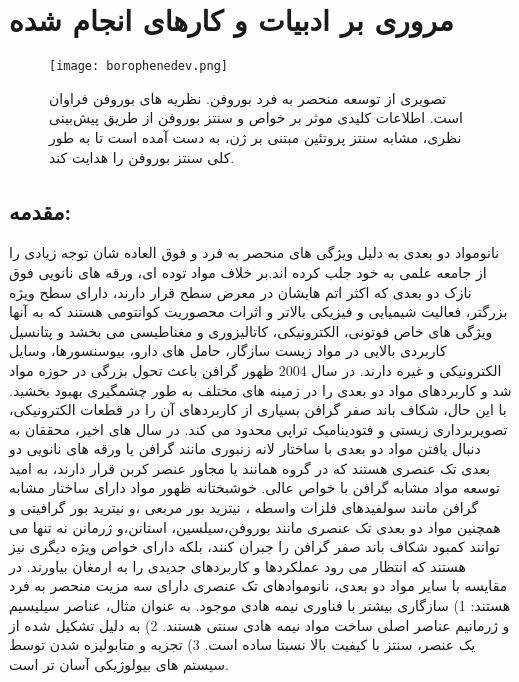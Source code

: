 \chapter{مروری بر ادبیات و کار‌های انجام شده}
\clearpage
\begin{figure*}[!ht]
    \centering
    \texttt{[image: borophenedev.png]}
    \caption{تصویری از توسعه منحصر به فرد بوروفن. نظریه های بوروفن فراوان است. اطلاعات کلیدی موثر بر خواص و سنتز بوروفن از طریق پیش‌بینی نظری، مشابه سنتز پروتئین مبتنی بر ژن، به دست آمده است تا به طور کلی سنتز بوروفن را هدایت کند.}
    \label{fig:borophenedev}
\end{figure*}
\section{مقدمه:}
نانومواد دو بعدی به دلیل ویژگی های منحصر به فرد و فوق العاده شان توجه زیادی را از جامعه علمی به خود جلب کرده اند.\cite{huangGraphenebasedComposites2012, huangGrapheneBasedMaterialsSynthesis2011}بر خلاف مواد توده ای، ورقه های نانویی فوق نازک دو بعدی که اکثر اتم هایشان در معرض سطح قرار دارند، دارای سطح ویژه بزرگتر، فعالیت شیمیایی و فیزیکی بالاتر و اثرات محصوریت کوانتومی هستند که به آنها ویژگی های خاص فوتونی، الکترونیکی، کاتالیزوری و مغناطیسی می بخشد و پتانسیل کاربردی بالایی در مواد زیست سازگار، حامل های دارو، بیوسنسورها، وسایل الکترونیکی و غیره دارند.\cite{lu2DTransitionMetalDichalcogenideNanosheetBasedComposites2016, chhowallaChemistryTwodimensionalLayered2013, sunElectronicStructuresSiC2008} در سال 2004 ظهور گرافن باعث تحول بزرگی در حوزه مواد شد و کاربردهای مواد دو بعدی را در زمینه های مختلف به طور چشمگیری بهبود بخشید. \cite{novoselovElectricFieldEffect2004, geimRiseGraphene2007} با این حال، شکاف باند صفر گرافن بسیاری از کاربردهای آن را در قطعات الکترونیکی، تصویربرداری زیستی و فتودینامیک تراپی محدود می کند. در سال های اخیر، محققان به دنبال یافتن مواد دو بعدی با ساختار لانه زنبوری مانند گرافن یا ورقه های نانویی دو بعدی تک عنصری هستند که در گروه همانند یا مجاور عنصر کربن قرار دارند، به امید توسعه مواد مشابه گرافن با خواص عالی. خوشبختانه ظهور مواد دارای ساختار مشابه گرافن مانند سولفیدهای فلزات واسطه \cite{dingDefectEngineeredBioactive2019, liRatiometricImmunoassaysBuilt2019}، نیترید بور مربعی \cite{deanBoronNitrideSubstrates2010}،و نیترید بور گرافیتی \cite{caoPolymericPhotocatalystsBased2015}و همچنین مواد دو بعدی تک عنصری مانند بوروفن\cite{fengExperimentalRealizationTwodimensional2016}،سیلسین\cite{fengEvidenceSiliceneHoneycomb2012,chenEvidenceDiracFermions2012,duTuningBandGap2014}، استانن\cite{gouStraininducedBandEngineering2017, zhuEpitaxialGrowthTwodimensional2015}،و ژرمانن \cite{niTunableBandgapSilicene2012} نه تنها می توانند کمبود شکاف باند صفر گرافن را جبران کنند، بلکه دارای خواص ویژه دیگری نیز هستند که انتظار می رود عملکردها و کاربردهای جدیدی را به ارمغان بیاورند. در مقایسه با سایر مواد دو بعدی، نانوموادهای تک عنصری دارای سه مزیت منحصر به فرد هستند: 1) سازگاری بیشتر با فناوری نیمه هادی موجود. به عنوان مثال، عناصر سیلیسیم و ژرمانیم عناصر اصلی ساخت مواد نیمه هادی سنتی هستند. 2) به دلیل تشکیل شده از یک عنصر، سنتز با کیفیت بالا نسبتا ساده است. 3) تجزیه و متابولیزه شدن توسط سیستم های بیولوژیکی آسان تر است. 